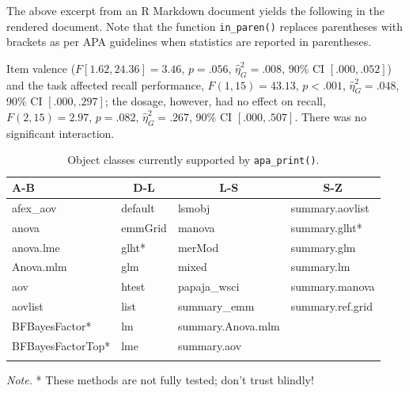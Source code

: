 \documentclass[
  english,
  ,man,floatsintext]{apa6}
\begin{document}
The above excerpt from an R Markdown document yields the following in the rendered document.
Note that the function \texttt{in\_paren()} replaces parentheses with brackets as per APA guidelines when statistics are reported in parentheses.

\begin{displayquote}
Item valence (\(F[1.62, 24.36] = 3.46\), \(p = .056\), \(\hat{\eta}^2_G = .008\), 90\% CI \([.000, .052]\)) and the task affected recall performance, \(F(1, 15) = 43.13\), \(p < .001\), \(\hat{\eta}^2_G = .048\), 90\% CI \([.000, .297]\); the dosage, however, had no effect on recall, \(F(2, 15) = 2.97\), \(p = .082\), \(\hat{\eta}^2_G = .267\), 90\% CI \([.000, .507]\).
There was no significant interaction.
\end{displayquote}



\begin{table}[tbp]

\begin{center}
\begin{threeparttable}

\caption{\label{tab:apa-print-methods}Object classes currently supported by \texttt{apa\_print()}.}

\begin{tabular}{llll}
\toprule
A-B & \multicolumn{1}{c}{D-L} & \multicolumn{1}{c}{L-S} & \multicolumn{1}{c}{S-Z}\\
\midrule
afex\_aov & default & lsmobj & summary.aovlist\\
anova & emmGrid & manova & summary.glht*\\
anova.lme & glht* & merMod & summary.glm\\
Anova.mlm & glm & mixed & summary.lm\\
aov & htest & papaja\_wsci & summary.manova\\
aovlist & list & summary\_emm & summary.ref.grid\\
BFBayesFactor* & lm & summary.Anova.mlm & \\
BFBayesFactorTop* & lme & summary.aov & \\
\bottomrule
\addlinespace
\end{tabular}

\begin{tablenotes}[para]
\normalsize{\textit{Note.} * These methods are not fully tested; don't trust blindly!}
\end{tablenotes}

\end{threeparttable}
\end{center}

\end{table}
\end{document}
